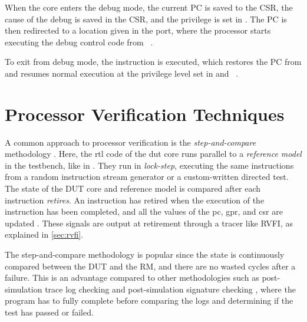 When the core enters the debug mode, the current PC is saved to the  CSR, the cause of the debug is saved in the  CSR, and the privilege is set in . The PC is then redirected to a location given in the  port, where the processor starts executing the debug control code from ~\cite{openhwgroupDebugTriggerCOREV2023}.

To exit from debug mode, the  instruction is executed, which restores the PC from  and resumes normal execution at the privilege level set in  and ~\cite{pauldonahueRISCVDebugSupport2023}.

\section{Processor Verification Techniques}
\label{sec:bg_verificationTech}


A common approach to processor verification is the \textit{step-and-compare} methodology \cite{taylorAdvancedRISCVVerification2023}. Here, the \acrshort{rtl} code of the \acrshort{dut} core runs parallel to a \textit{reference model} in the testbench, like in . They run in \textit{lock-step}, executing the same instructions from a random instruction stream generator or a custom-written directed test. The state of the DUT core and reference model is compared after each instruction \textit{retires}. An instruction has retired when the execution of the instruction has been completed, and all the values of the \acrfull{pc}, \acrfull{gpr}, and \acrfull{csr} are updated \cite{taylorAdvancedRISCVVerification2023}. These signals are output at retirement through a tracer like RVFI, as explained in \cref{sec:rvfi}.

The step-and-compare methodology is popular since the state is continuously compared between the DUT and the RM, and there are no wasted cycles after a failure. This is an advantage compared to other methodologies such as post-simulation trace log checking and post-simulation signature checking \cite{duncangrahamRISCVVerificationImplications2023}, where the program has to fully complete before comparing the logs and determining if the test has passed or failed.


